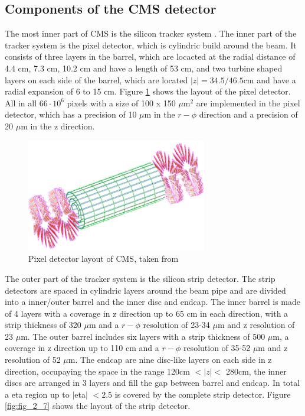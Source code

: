\subsection{Components of the \gls{CMS} detector}
\label{sec:section_2_2_2}

The most inner part of \gls{CMS} is the silicon tracker system \cite{CMS2, CMSTRACKER}. The inner part of the tracker system is the pixel detector, which is cylindric build around the beam. It consists of three layers in the barrel, which are locacted at the radial distance of 4.4 cm, 7.3 cm, 10.2 cm and have a length of 53 cm, and two turbine shaped layers on each side of the barrel, which are located $|z| = 34.5/46.5$cm and have a radial expansion of 6 to 15 cm. Figure \ref{fig:fig_2_6} shows the layout of the pixel detector. All in all $66\cdot 10^{6}$ pixels with a size of 100 x 150 $\mu$m$^{2}$ are implemented in the pixel detector, which has a precision of 10 $\mu$m in the $r-\phi$ direction and a precision of 20 $\mu$m in the z direction. \\

\begin{figure}[ht]
	\centering
	\includegraphics[width=0.7\textwidth]{pictures/CMS_tracker.pdf}

	\caption[Pixel detector layout of CMS]{Pixel detector layout of CMS, taken from \cite{CMS2}}
	\label{fig:fig_2_6}
\end{figure}


The outer part of the tracker system is the silicon strip detector. The strip detectors are spaced in cylindric layers around the beam pipe and are divided into a inner/outer barrel and the inner disc and endcap. The inner barrel is made of 4 layers with a coverage in z direction up to 65 cm in each direction, with a strip thickness of 320 $\mu$m and a $r-\phi$ resolution of 23-34 $\mu$m and z resolution of 23 $\mu$m. The outer barrel includes six layers with a strip thickness of 500 $\mu$m, a coverage in z direction up to 110 cm and a $r-\phi$ resolution of 35-52 $\mu$m and z resolution of 52 $\mu$m. The endcap are nine disc-like layers on each side in z direction, occupaying the space in the range 120cm $< |z| < $ 280cm, the inner discs are arranged in 3 layers and fill the gap between barrel and endcap. In total a \gls{eta} region up to $|$\gls{eta}$|$ $< 2.5$ is covered by the complete strip detector. Figure \ref{fig:fig_2_7} shows the layout of the strip detector. \\

